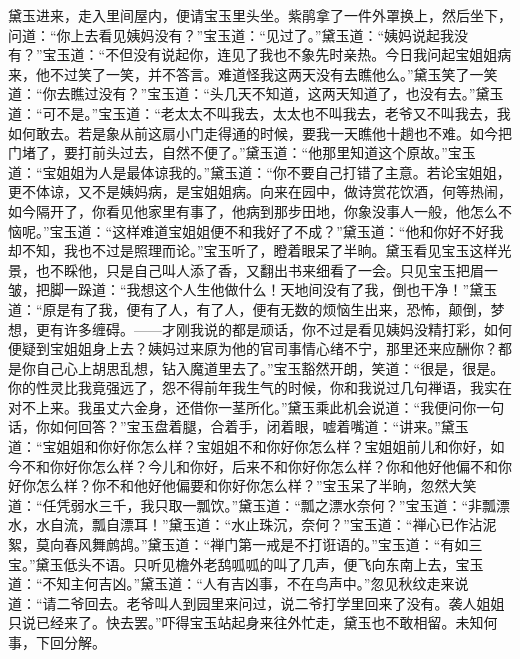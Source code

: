 \begin{parag}
    黛玉进来，走入里间屋内，便请宝玉里头坐。紫鹃拿了一件外罩换上，然后坐下，问道：“你上去看见姨妈没有？”宝玉道：“见过了。”黛玉道：“姨妈说起我没有？”宝玉道：“不但没有说起你，连见了我也不象先时亲热。今日我问起宝姐姐病来，他不过笑了一笑，并不答言。难道怪我这两天没有去瞧他么。”黛玉笑了一笑道：“你去瞧过没有？”宝玉道：“头几天不知道，这两天知道了，也没有去。”黛玉道：“可不是。”宝玉道：“老太太不叫我去，太太也不叫我去，老爷又不叫我去，我如何敢去。若是象从前这扇小门走得通的时候，要我一天瞧他十趟也不难。如今把门堵了，要打前头过去，自然不便了。”黛玉道：“他那里知道这个原故。”宝玉道：“宝姐姐为人是最体谅我的。”黛玉道：“你不要自己打错了主意。若论宝姐姐，更不体谅，又不是姨妈病，是宝姐姐病。向来在园中，做诗赏花饮酒，何等热闹，如今隔开了，你看见他家里有事了，他病到那步田地，你象没事人一般，他怎么不恼呢。”宝玉道：“这样难道宝姐姐便不和我好了不成？”黛玉道：“他和你好不好我却不知，我也不过是照理而论。”宝玉听了，瞪着眼呆了半晌。黛玉看见宝玉这样光景，也不睬他，只是自己叫人添了香，又翻出书来细看了一会。只见宝玉把眉一皱，把脚一跺道：“我想这个人生他做什么！天地间没有了我，倒也干净！”黛玉道：“原是有了我，便有了人，有了人，便有无数的烦恼生出来，恐怖，颠倒，梦想，更有许多缠碍。——才刚我说的都是顽话，你不过是看见姨妈没精打彩，如何便疑到宝姐姐身上去？姨妈过来原为他的官司事情心绪不宁，那里还来应酬你？都是你自己心上胡思乱想，钻入魔道里去了。”宝玉豁然开朗，笑道：“很是，很是。你的性灵比我竟强远了，怨不得前年我生气的时候，你和我说过几句禅语，我实在对不上来。我虽丈六金身，还借你一茎所化。”黛玉乘此机会说道：“我便问你一句话，你如何回答？”宝玉盘着腿，合着手，闭着眼，嘘着嘴道：“讲来。”黛玉道：“宝姐姐和你好你怎么样？宝姐姐不和你好你怎么样？宝姐姐前儿和你好，如今不和你好你怎么样？今儿和你好，后来不和你好你怎么样？你和他好他偏不和你好你怎么样？你不和他好他偏要和你好你怎么样？”宝玉呆了半晌，忽然大笑道：“任凭弱水三千，我只取一瓢饮。”黛玉道：“瓢之漂水奈何？”宝玉道：“非瓢漂水，水自流，瓢自漂耳！”黛玉道：“水止珠沉，奈何？”宝玉道：“禅心已作沾泥絮，莫向春风舞鹧鸪。”黛玉道：“禅门第一戒是不打诳语的。”宝玉道：“有如三宝。”黛玉低头不语。只听见檐外老鸹呱呱的叫了几声，便飞向东南上去，宝玉道：“不知主何吉凶。”黛玉道：“人有吉凶事，不在鸟声中。”忽见秋纹走来说道：“请二爷回去。老爷叫人到园里来问过，说二爷打学里回来了没有。袭人姐姐只说已经来了。快去罢。”吓得宝玉站起身来往外忙走，黛玉也不敢相留。未知何事，下回分解。
\end{parag}